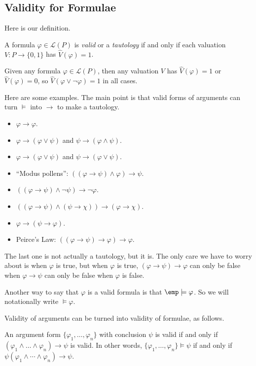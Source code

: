 \subsection{Validity for Formulae}
Here is our definition.
\begin{definition}
	A formula $\varphi\in\mathcal L(P)$ is \textit{valid} or a \textit{tautology} if and only if each valuation $V:P\to\{0,1\}$ has $\hat V(\varphi)=1$.
\end{definition}
\begin{example}
	Given any formula $\varphi\in\mathcal L(P)$, then any valuation $V$ has $\hat V(\varphi)=1$ or $\hat V(\varphi)=0$, so $\hat V(\varphi\lor\lnot\varphi)=1$ in all cases.
\end{example}
Here are some examples. The main point is that valid forms of arguments can turn $\models$ into $\to$ to make a tautology.
\begin{itemize}
	\item $\varphi\to\varphi$.
	\item $\varphi\to(\varphi\lor\psi)$ and $\psi\to(\varphi\land\psi)$.
	\item $\varphi\to(\varphi\lor\psi)$ and $\psi\to(\varphi\lor\psi)$.
	\item ``Modus pollens'': $((\varphi\to\psi)\land\varphi)\to\psi$.
	\item $((\varphi\to\psi)\land\lnot\psi)\to\lnot\varphi$.
	\item $((\varphi\to\psi)\land(\psi\to\chi))\to(\varphi\to\chi)$.
	\item $\varphi\to(\psi\to\varphi)$.
	\item Peirce's Law: $((\varphi\to\psi)\to\varphi)\to\varphi$.
\end{itemize}
The last one is not actually a tautology, but it is. The only care we have to worry about is when $\varphi$ is true, but when $\varphi$ is true, $(\varphi\to\psi)\to\varphi$ can only be false when $\varphi\to\psi$ can only be false when $\varphi$ is false.
\begin{remark}
	Another way to say that $\varphi$ is a valid formula is that $\emp\models\varphi$. So we will notationally write $\models\varphi$.
\end{remark}
Validity of arguments can be turned into validity of formulae, as follows.
\begin{theorem}[Deduction]
	An argument form $\{\varphi_1,\ldots,\varphi_n\}$ with conclusion $\psi$ is valid if and only if $(\varphi_1\land\ldots\land\varphi_n)\to\psi$ is valid. In other words, $\{\varphi_1,\ldots,\varphi_n\}\models\psi$ if and only if $\psi(\varphi_1\land\cdots\land\varphi_n)\to\psi$.
\end{theorem}
